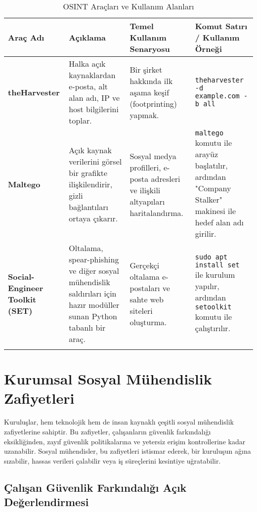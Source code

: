 \begin{longtable}{|p{4cm}|p{4cm}|p{4cm}|p{4cm}|}
    \hline
    \textbf{Araç Adı} & \textbf{Açıklama} & \textbf{Temel Kullanım Senaryosu} & \textbf{Komut Satırı / Kullanım Örneği} \\
    \hline
    \endhead
    \textbf{theHarvester} & Halka açık kaynaklardan e-posta, alt alan adı, IP ve host bilgilerini toplar. & Bir şirket hakkında ilk aşama keşif (footprinting) yapmak. & \verb|theharvester -d example.com -b all| \\
    \hline
    \textbf{Maltego} & Açık kaynak verilerini görsel bir grafikte ilişkilendirir, gizli bağlantıları ortaya çıkarır. & Sosyal medya profilleri, e-posta adresleri ve ilişkili altyapıları haritalandırma. & \verb|maltego| komutu ile arayüz başlatılır, ardından "Company Stalker" makinesi ile hedef alan adı girilir. \\
    \hline
    \textbf{Social-Engineer Toolkit (SET)} & Oltalama, spear-phishing ve diğer sosyal mühendislik saldırıları için hazır modüller sunan Python tabanlı bir araç. & Gerçekçi oltalama e-postaları ve sahte web siteleri oluşturma. & \verb|sudo apt install set| ile kurulum yapılır, ardından \verb|setoolkit| komutu ile çalıştırılır. \\
    \hline
\caption{OSINT Araçları ve Kullanım Alanları}
\end{longtable}

\section{Kurumsal Sosyal Mühendislik Zafiyetleri}

Kuruluşlar, hem teknolojik hem de insan kaynaklı çeşitli sosyal mühendislik zafiyetlerine sahiptir. Bu zafiyetler, çalışanların güvenlik farkındalığı eksikliğinden, zayıf güvenlik politikalarına ve yetersiz erişim kontrollerine kadar uzanabilir. Sosyal mühendisler, bu zafiyetleri istismar ederek, bir kuruluşun ağına sızabilir, hassas verileri çalabilir veya iş süreçlerini kesintiye uğratabilir.

\subsection{Çalışan Güvenlik Farkındalığı Açık Değerlendirmesi}


